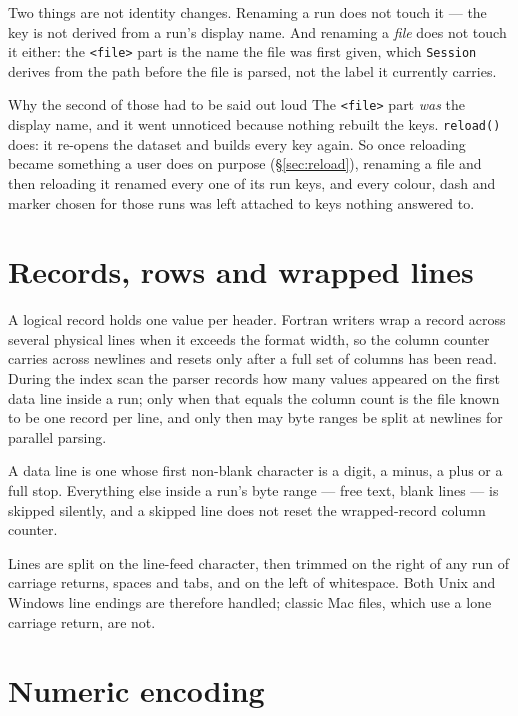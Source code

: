 \documentclass[11pt,a4paper,oneside]{report}
\newcommand{\code}[1]{\texttt{#1}}
\begin{document}
Two things are not identity changes. Renaming a run does not touch it --- the
key is not derived from a run's display name. And renaming a \emph{file} does
not touch it either: the \code{<file>} part is the name the file was first
given, which \code{Session} derives from the path before the file is parsed,
not the label it currently carries.

\begin{aoenote}{Why the second of those had to be said out loud}
The \code{<file>} part \emph{was} the display name, and it went unnoticed
because nothing rebuilt the keys. \code{reload()} does: it re-opens the dataset
and builds every key again. So once reloading became something a user does on
purpose (\S\ref{sec:reload}), renaming a file and then reloading it renamed
every one of its run keys, and every colour, dash and marker chosen for those
runs was left attached to keys nothing answered to.
\end{aoenote}

\section{Records, rows and wrapped lines}

A logical record holds one value per header. Fortran writers wrap a record across
several physical lines when it exceeds the format width, so the column counter
carries across newlines and resets only after a full set of columns has been
read. During the index scan the parser records how many values appeared on the
first data line inside a run; only when that equals the column count is the file
known to be one record per line, and only then may byte ranges be split at
newlines for parallel parsing.

A data line is one whose first non-blank character is a digit, a minus, a plus or
a full stop. Everything else inside a run's byte range --- free text, blank lines
--- is skipped silently, and a skipped line does not reset the wrapped-record
column counter.

Lines are split on the line-feed character, then trimmed on the right of any run
of carriage returns, spaces and tabs, and on the left of whitespace. Both Unix
and Windows line endings are therefore handled; classic Mac files, which use a
lone carriage return, are not.

\section{Numeric encoding}
\end{document}
